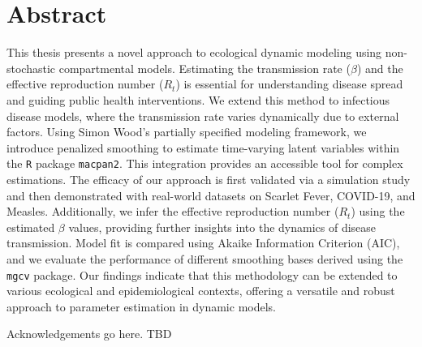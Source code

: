 \documentclass[
11pt, %
oneside, %
english, %
singlespacing, %
]{macthesis} %
\def\blankpage{%
      \clearpage%
      \thispagestyle{empty}%
      \addtocounter{page}{-1}%
      \null%
      \clearpage}
\begin{document}

\section*{\Huge Abstract}
\addchaptertocentry{\abstractname}
This thesis presents a novel approach to ecological dynamic modeling using non-stochastic compartmental models. Estimating the transmission rate (\(\beta\)) and the effective reproduction number (\(R_t\)) is essential for understanding disease spread and guiding public health interventions. We extend this method to infectious disease models, where the transmission rate varies dynamically due to external factors. Using Simon Wood's partially specified modeling framework, we introduce penalized smoothing to estimate time-varying latent variables within the \texttt{R} package \texttt{macpan2}. This integration provides an accessible tool for complex estimations. The efficacy of our approach is first validated via a simulation study and then demonstrated with real-world datasets on Scarlet Fever, COVID-19, and Measles. Additionally, we infer the effective reproduction number (\(R_t\)) using the estimated \(\beta\) values, providing further insights into the dynamics of disease transmission. Model fit is compared using Akaike Information Criterion (AIC), and we evaluate the performance of different smoothing bases derived using the \texttt{mgcv} package. Our findings indicate that this methodology can be extended to various ecological and epidemiological contexts, offering a versatile and robust approach to parameter estimation in dynamic models.
\blankpage
\clearpage


  \begin{acknowledgements}
  \addchaptertocentry{\acknowledgementname} %
    Acknowledgements go here. TBD
  \end{acknowledgements}
\blankpage
\clearpage

\end{document}
